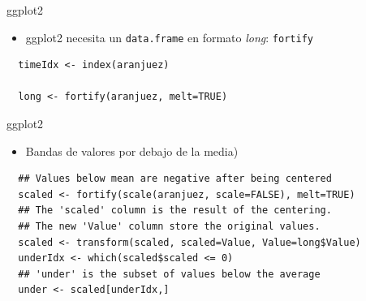 \documentclass[xcolor={usenames,svgnames,dvipsnames}]{beamer}
\begin{document}
\begin{frame}[fragile,label=sec-2-3-3]{ggplot2}
 \begin{itemize}
\item ggplot2 necesita un \texttt{data.frame} en formato \emph{long}: \texttt{fortify}
\end{itemize}
\lstset{language=R,label= ,caption= ,numbers=none}
\begin{lstlisting}
  timeIdx <- index(aranjuez)
  
  long <- fortify(aranjuez, melt=TRUE)
\end{lstlisting}
\end{frame}
\begin{frame}[fragile,label=sec-2-3-4]{ggplot2}
 \begin{itemize}
\item Bandas de valores por debajo de la media)
\end{itemize}
\lstset{language=R,label= ,caption= ,numbers=none}
\begin{lstlisting}
  ## Values below mean are negative after being centered
  scaled <- fortify(scale(aranjuez, scale=FALSE), melt=TRUE)
  ## The 'scaled' column is the result of the centering.
  ## The new 'Value' column store the original values.
  scaled <- transform(scaled, scaled=Value, Value=long$Value)
  underIdx <- which(scaled$scaled <= 0)
  ## 'under' is the subset of values below the average
  under <- scaled[underIdx,]
\end{lstlisting}
\end{frame}
\end{document}
